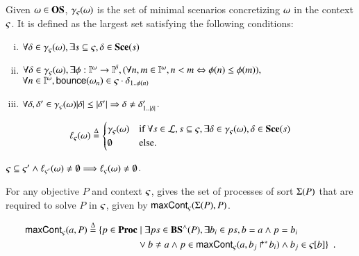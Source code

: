 \begin{definition}[$\concr: \OS \to \powerset(\Sce)$]\label{def:concr}
Given $\omega\in\mathbf{OS}$, $\gamma_\varsigma(\omega)$ is the set of minimal scenarios concretizing $\omega$ in the
context $\varsigma$. It is defined as the largest set satisfying the following conditions:
\begin{enumerate}[(i)]
\item $\forall\delta\in\gamma_\varsigma(\omega), \exists s\subseteq\varsigma, \delta\in\mathbf{Sce}(s)$
\item $\forall\delta\in\gamma_\varsigma(\omega),
  \exists \phi:\mathbb{I}^{\omega}\to\mathbb{I}^{\delta},
    (\forall n,m\in\mathbb{I}^{\omega}, n<m \Leftrightarrow \phi(n)\leq\phi(m)),$
\\\hspace*{2cm}$\forall n\in\mathbb{I}^{\omega}, \mathsf{bounce}(\omega_n) \in \varsigma\cdot\delta_{1..\phi(n)}$
\item $\forall\delta,\delta'\in\gamma_\varsigma(\omega)
				|\delta|\leq|\delta'| \Rightarrow
					\delta\neq\delta'_{1..|\delta|}$.
\end{enumerate}
\end{definition}
\begin{definition}[$\uconcr: \OS \rightarrow \powerset(\Sce)$]
\label{def:uconcr}
  \[
  \ell_\varsigma(\omega) \stackrel{\Delta}=
  \begin{cases}
    \gamma_\varsigma(\omega) & \text{if } \forall s \in \mathcal{L}, s \subseteq \varsigma, \exists \delta \in \gamma_\varsigma(\omega), \delta \in \mathbf{Sce}(s) \\
    \emptyset & \text{else.}
  \end{cases}
  \]
\end{definition}
% 
\begin{lemma}
\label{lem:uconcr-ctx}
  $\varsigma \subseteq \varsigma' \wedge \ell_{\varsigma'}(\omega) \neq \emptyset \Longrightarrow \ell_{\varsigma}(\omega) \neq \emptyset$.
\end{lemma}

For any objective $P$ and context $\varsigma$,  gives the set of processes of sort $\Sigma(P)$ that are required to solve $P$ in $\varsigma$, given by $\mathsf{maxCont}_\varsigma(\Sigma(P), P)$.
\begin{definition}[$\gCont_\ctx : \Sigma \times \Obj \rightarrow \powerset(\PHproc)$]
  \label{def:maxCont}
  \begin{align*}
    \mathsf{maxCont}_\varsigma(a,P) \stackrel{\Delta}=
    \{ p \in \mathbf{Proc} &\mid \exists ps \in \mathbf{BS}^\wedge(P), \exists b_i \in ps, b = a \wedge p = b_i \\
      & \vee b \neq a \wedge p \in \mathsf{maxCont}_\varsigma(a, \mbox{$b_j\Rsh^*\!b_i$}) \wedge b_j \in {\varsigma[b]} \}
    \enspace.
  \end{align*}
\end{definition}

